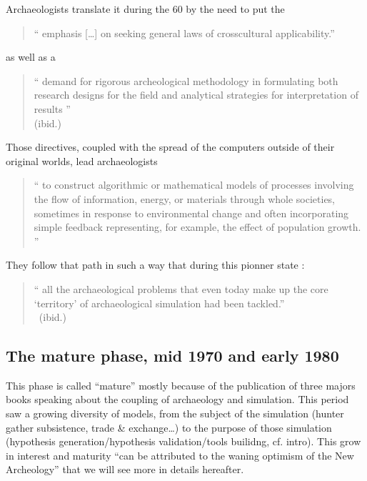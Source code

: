 \documentclass[a4paper]{article}
\begin{document}
Archaeologists translate it during the 60 by the need to put the
\begin{quote}
	``
	emphasis [\ldots] on seeking general laws of crosscultural applicability.''
	\\\cite[p.~297]{redman1991indefenseoftheseventiestheadolescenceofnewarcheology}
\end{quote}
as well as a
\begin{quote}
	``
	demand for rigorous archeological methodology in formulating both research designs for the field and analytical strategies for interpretation of results ''
	\\(ibid.)
\end{quote}

Those directives, coupled with the spread of the computers outside of their original worlds, lead archaeologists 
\begin{quote}
	``
	 to construct algorithmic or mathematical models of processes involving the flow of information, energy, or materials through whole societies, sometimes in response to environmental change and often incorporating simple feedback representing, for example, the effect of population growth.  ''
	 \\\cite{lake2014trendsinarchaeologicalsimulation}
\end{quote}
They follow that path in such a way that during this pionner state : 
\begin{quote}
	``
	all the archaeological problems that even today make up the core ‘territory’ of archaeological simulation had been tackled.''
	\\ (ibid.)
\end{quote}


\subsection{The mature phase, mid 1970 and early 1980}

This phase is called ``mature'' mostly because of the publication of three majors books speaking about the coupling of archaeology and simulation. 
This period saw a growing diversity of models, from the subject of the simulation (hunter gather subsistence, trade \& exchange\ldots) to the purpose of those simulation (hypothesis generation/hypothesis validation/tools builidng, cf. intro). This grow in interest and maturity ``can be attributed to the waning optimism of the New Archeology'' \citep{lake2014trendsinarchaeologicalsimulation} that we will see more in details hereafter.
\end{document}
